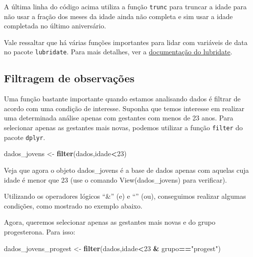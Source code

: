 \documentclass[
]{book}
\newenvironment{Shaded}{\begin{snugshade}}{\end{snugshade}}
\newcommand{\DecValTok}[1]{\textcolor[rgb]{0.00,0.00,0.81}{#1}}
\newcommand{\KeywordTok}[1]{\textcolor[rgb]{0.13,0.29,0.53}{\textbf{#1}}}
\newcommand{\NormalTok}[1]{#1}
\newcommand{\OperatorTok}[1]{\textcolor[rgb]{0.81,0.36,0.00}{\textbf{#1}}}
\newcommand{\StringTok}[1]{\textcolor[rgb]{0.31,0.60,0.02}{#1}}
\begin{document}
A última linha do código acima utiliza a função \texttt{trunc} para truncar a idade para não usar a fração dos meses da idade ainda não completa e sim usar a idade completada no último aniversário.

Vale ressaltar que há várias funções importantes para lidar com variáveis de data no pacote \texttt{lubridate}. Para mais detalhes, ver a \href{https://cran.r-project.org/web/packages/lubridate/vignettes/lubridate.html}{documentação do lubridate}.

\hypertarget{filtragem-de-observauxe7uxf5es}{%
\subsection{Filtragem de observações}\label{filtragem-de-observauxe7uxf5es}}

Uma função bastante importante quando estamos analisando dados é filtrar de acordo com uma condição de interesse. Suponha que temos interesse em realizar uma determinada análise apenas com gestantes com menos de 23 anos. Para selecionar apenas as gestantes mais novas, podemos utilizar a função \texttt{filter} do pacote \texttt{dplyr}.

\begin{Shaded}
\begin{Highlighting}[]
\NormalTok{dados_jovens <-}\StringTok{ }\KeywordTok{filter}\NormalTok{(dados,idade}\OperatorTok{<}\DecValTok{23}\NormalTok{)}
\end{Highlighting}
\end{Shaded}

Veja que agora o objeto dados\_jovens é a base de dados apenas com aquelas cuja idade é menor que 23 (use o comando View(dados\_jovens) para verificar).

Utilizando os operadores lógicos ``\&'' (e) e ``\textbar{}'' (ou), conseguimos realizar algumas condições, como mostrado no exemplo abaixo.

Agora, queremos selecionar apenas as gestantes mais novas e do grupo progesterona. Para isso:

\begin{Shaded}
\begin{Highlighting}[]
\NormalTok{dados_jovens_progest <-}\StringTok{  }\KeywordTok{filter}\NormalTok{(dados,idade}\OperatorTok{<}\DecValTok{23} \OperatorTok{&}\StringTok{ }\NormalTok{grupo}\OperatorTok{==}\StringTok{"progest"}\NormalTok{)}
\end{Highlighting}
\end{Shaded}
\end{document}

